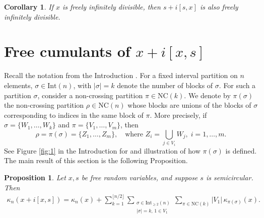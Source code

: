 \documentclass{amsart}
\newtheorem{prop}[claim]{Proposition}
\newtheorem{cor}[claim]{Corollary}
\begin{document}
\begin{cor}
  If $ x $ is freely infinitely divisible, then $ s + i[s, x] $ is also freely infinitely divisible.
\end{cor}




\section{Free cumulants of $x+i[x,s]$}

Recall the notation from the Introduction . For a fixed interval partition on \( n \) elements, \( \sigma \in \mathrm{Int}(n) \), with \( |\sigma| = k \) denote the number of blocks of \( \sigma \).  
For such a partition \( \sigma \), consider a non-crossing partition \( \pi \in \mathrm{NC}(k) \).  
We denote by \( \pi(\sigma) \) the non-crossing partition \( \rho \in \mathrm{NC}(n) \) whose blocks are unions of the blocks of \( \sigma \) corresponding to indices in the same block of \( \pi \).  
More precisely, if \( \sigma = \{W_1, \ldots, W_k\} \) and \( \pi = \{V_1, \ldots, V_m\} \), then
\[
\rho = \pi(\sigma) = \{Z_1, \ldots, Z_m\}, \quad \text{where } Z_i = \bigcup_{j \in V_i} W_j, \; i = 1,\ldots,m.
\]
See Figure \ref{fig:1} in the Introduction for and illustration of how $\pi(\sigma)$ is defined.
The main result of this section is the following Proposition. 

\begin{prop}\label{prop:41}
	Let \( x, s \) be free random variables, and suppose \( s \) is semicircular. Then
	\begin{align}\label{eq:41}
	\kappa_n(x+i[x,s])
	=\kappa_n(x)+ \sum_{k=1}^{\lfloor n/2 \rfloor} 
	\sum_{\substack{\sigma \in \mathrm{Int}_{\geq 2}(n) \\ |\sigma|=k,\, 1 \in V_1}}
	\sum_{\pi \in \mathrm{NC}(k)} 
	|V_1|\, \kappa_{\pi(\sigma)}(x).
	\end{align}
\end{prop}
\end{document}
